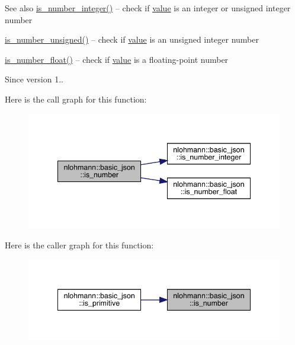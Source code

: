 \begin{DoxySeeAlso}{See also}
\mbox{\hyperlink{classnlohmann_1_1basic__json_abac8af76067f1e8fdca9052882c74428}{is\+\_\+number\+\_\+integer()}} -- check if \mbox{\hyperlink{classnlohmann_1_1basic__json_af9c51328fbe1da75eca750be3009917a}{value}} is an integer or unsigned integer number 

\mbox{\hyperlink{classnlohmann_1_1basic__json_abc7378cba0613a78b9aad1c8e7044bb0}{is\+\_\+number\+\_\+unsigned()}} -- check if \mbox{\hyperlink{classnlohmann_1_1basic__json_af9c51328fbe1da75eca750be3009917a}{value}} is an unsigned integer number 

\mbox{\hyperlink{classnlohmann_1_1basic__json_a33b4bf898b857c962e798fc7f6e86e70}{is\+\_\+number\+\_\+float()}} -- check if \mbox{\hyperlink{classnlohmann_1_1basic__json_af9c51328fbe1da75eca750be3009917a}{value}} is a floating-\/point number
\end{DoxySeeAlso}
\begin{DoxySince}{Since}
version 1.. 
\end{DoxySince}
Here is the call graph for this function\+:\nopagebreak
\begin{figure}[H]
\begin{center}
\leavevmode
\includegraphics[width=341pt]{classnlohmann_1_1basic__json_a2b9852390abb4b1ef5fac6984e2fc0f3_cgraph}
\end{center}
\end{figure}
Here is the caller graph for this function\+:\nopagebreak
\begin{figure}[H]
\begin{center}
\leavevmode
\includegraphics[width=341pt]{classnlohmann_1_1basic__json_a2b9852390abb4b1ef5fac6984e2fc0f3_icgraph}
\end{center}
\end{figure}
